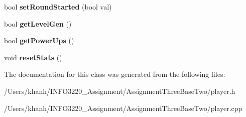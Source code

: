 \begin{DoxyCompactItemize}
\item 
\hypertarget{class_player_ac90d16287b2569050c652d4fb20424ed}{bool {\bfseries set\+Round\+Started} (bool val)}\label{class_player_ac90d16287b2569050c652d4fb20424ed}

\item 
\hypertarget{class_player_a9e5dc273ee10345d49be88f07a19d0aa}{bool {\bfseries get\+Level\+Gen} ()}\label{class_player_a9e5dc273ee10345d49be88f07a19d0aa}

\item 
\hypertarget{class_player_a061abc3a6fd39a93add484f4a57ad6d5}{bool {\bfseries get\+Power\+Ups} ()}\label{class_player_a061abc3a6fd39a93add484f4a57ad6d5}

\item 
\hypertarget{class_player_ad85b7618b95a6d763db0587760fd2dd3}{void {\bfseries reset\+Stats} ()}\label{class_player_ad85b7618b95a6d763db0587760fd2dd3}

\end{DoxyCompactItemize}


The documentation for this class was generated from the following files\+:\begin{DoxyCompactItemize}
\item 
/\+Users/khanh/\+I\+N\+F\+O3220\+\_\+\+Assignment/\+Assignment\+Three\+Base\+Two/player.\+h\item 
/\+Users/khanh/\+I\+N\+F\+O3220\+\_\+\+Assignment/\+Assignment\+Three\+Base\+Two/player.\+cpp\end{DoxyCompactItemize}
